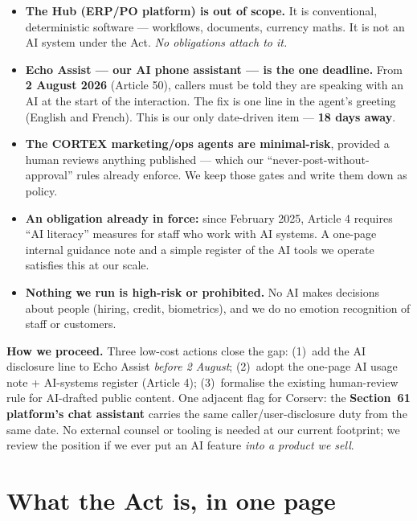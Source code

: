 \documentclass[11pt]{article}
\begin{document}
\begin{itemize}
  \item \textbf{The Hub (ERP/PO platform) is out of scope.} It is conventional,
    deterministic software --- workflows, documents, currency maths. It is not an
    AI system under the Act. \emph{No obligations attach to it.}
  \item \textbf{Echo Assist --- our AI phone assistant --- is the one deadline.}
    From \textbf{2 August 2026} (Article 50), callers must be told they are
    speaking with an AI at the start of the interaction. The fix is one line in
    the agent's greeting (English and French). This is our only date-driven item
    --- \textbf{18 days away}.
  \item \textbf{The CORTEX marketing/ops agents are minimal-risk}, provided a
    human reviews anything published --- which our ``never-post-without-approval''
    rules already enforce. We keep those gates and write them down as policy.
  \item \textbf{An obligation already in force:} since February 2025, Article 4
    requires ``AI literacy'' measures for staff who work with AI systems. A
    one-page internal guidance note and a simple register of the AI tools we
    operate satisfies this at our scale.
  \item \textbf{Nothing we run is high-risk or prohibited.} No AI makes decisions
    about people (hiring, credit, biometrics), and we do no emotion recognition
    of staff or customers.
\end{itemize}

\textbf{How we proceed.} Three low-cost actions close the gap: (1)~add the AI
disclosure line to Echo Assist \emph{before 2 August}; (2)~adopt the one-page AI
usage note + AI-systems register (Article 4); (3)~formalise the existing
human-review rule for AI-drafted public content. One adjacent flag for Corserv:
the \textbf{Section~61 platform's chat assistant} carries the same
caller/user-disclosure duty from the same date. No external counsel or tooling is
needed at our current footprint; we review the position if we ever put an AI
feature \emph{into a product we sell}.

\section{What the Act is, in one page}
\end{document}
